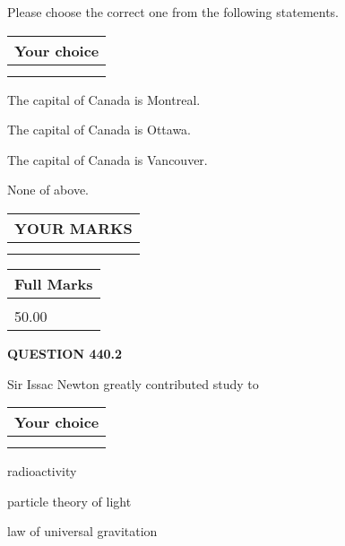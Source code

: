 \documentclass[12pt]{article}
\begin{document}
  
Please choose the correct one from the following statements.
  
  
\noindent\hspace{3.0in} \begin{tabular}{|l|}
\hline
Your choice \\
\hline
 \\ 
 \\ 
\hline
\end{tabular}
  
  
 
 
The capital of Canada is Montreal.
 
 
The capital of Canada is Ottawa.
 
 
The capital of Canada is Vancouver.
 
 
 None of above.
 
 
  
\vspace{0.2in}
  
\noindent\begin{tabular}{|l|}
\hline
 YOUR MARKS  \\
\hline
 \\ 
 \\ 
\hline
\end{tabular}
\hspace{0.05in} \begin{tabular}{|l|}
\hline
 Full Marks  \\
\hline
 \\ 
50.00 \\
\hline
\end{tabular}
{\textbf{\Large{QUESTION
440.2 
}}}
  
  
Sir Issac Newton greatly contributed study to
  
  
\noindent\hspace{3.0in} \begin{tabular}{|l|}
\hline
Your choice \\
\hline
 \\ 
 \\ 
\hline
\end{tabular}
  
  
 
 
radioactivity
 
 
particle theory of light
 
 
law of universal gravitation
 
\end{document}
